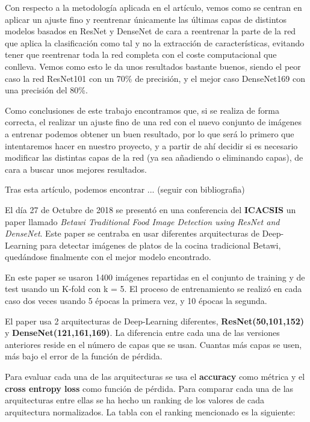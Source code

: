 Con respecto a la metodología aplicada en el artículo, vemos como se centran en aplicar un ajuste fino y reentrenar únicamente las últimas capas de distintos modelos basados en ResNet y DenseNet de cara a reentrenar la parte de la red que aplica la clasificación como tal y no la extracción de características, evitando tener que reentrenar toda la red completa con el coste computacional que conlleva. Vemos como esto le da unos resultados bastante buenos, siendo el peor caso la red ResNet101 con un 70\% de precisión, y el mejor caso DenseNet169 con una precisión del 80\%.


Como conclusiones de este trabajo encontramos que, si se realiza de forma correcta, el realizar un ajuste fino de una red con el nuevo conjunto de imágenes a entrenar podemos obtener un buen resultado, por lo que será lo primero que intentaremos hacer en nuestro proyecto, y a partir de ahí decidir si es necesario modificar las distintas capas de la red (ya sea añadiendo o eliminando capas), de cara a buscar unos mejores resultados.


Tras esta artículo, podemos encontrar ... (seguir con bibliografia)

\vspace{5 mm}

El día 27 de Octubre de 2018 se presentó en una conferencia del \textbf{ICACSIS} un paper llamado \textit{Betawi Traditional Food Image Detection using
ResNet and DenseNet}. Este paper se centraba en usar diferentes arquitecturas de Deep-Learning para detectar imágenes de platos de la cocina tradicional Betawi, quedándose finalmente con el mejor modelo encontrado.

\vspace{3 mm}

En este paper se usaron 1400 imágenes repartidas en el conjunto de training y de test usando un K-fold con k = 5. El proceso de entrenamiento se realizó en cada caso dos veces usando 5 épocas la primera vez, y 10 épocas la segunda.

\vspace{3 mm}

El paper usa 2 arquitecturas de Deep-Learning diferentes, \textbf{ResNet(50,101,152)} y \textbf{DenseNet(121,161,169)}. La diferencia entre cada una de las versiones anteriores reside en el número de capas que se usan. Cuantas más capas se usen, más bajo el error de la función de pérdida.

\vspace{3 mm}

Para evaluar cada una de las arquitecturas se usa el \textbf{accuracy} como métrica y el \textbf{cross entropy loss} como función de pérdida. Para comparar cada una de las arquitecturas entre ellas se ha hecho un ranking de los valores de cada arquitectura normalizados. La tabla con el ranking mencionado es la siguiente:

